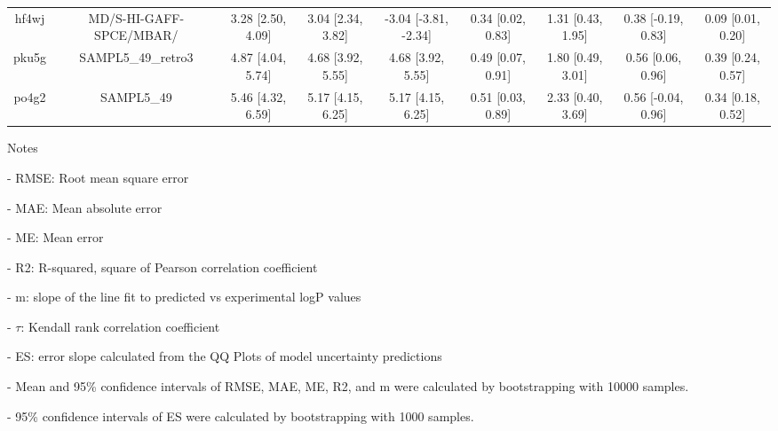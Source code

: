 \documentclass{article}
\begin{document}
\begin{center}
\begin{longtable}{|ccccccccc|}
 hf4wj &                            MD/S-HI-GAFF-SPCE/MBAR/ &  3.28 [2.50, 4.09] &  3.04 [2.34, 3.82] &  -3.04 [-3.81, -2.34] &  0.34 [0.02, 0.83] &    1.31 [0.43, 1.95] &   0.38 [-0.19, 0.83] &     0.09 [0.01, 0.20] \\
 pku5g &                                 SAMPL5\_49\_retro3 &  4.87 [4.04, 5.74] &  4.68 [3.92, 5.55] &     4.68 [3.92, 5.55] &  0.49 [0.07, 0.91] &    1.80 [0.49, 3.01] &    0.56 [0.06, 0.96] &     0.39 [0.24, 0.57] \\
 po4g2 &                                         SAMPL5\_49 &  5.46 [4.32, 6.59] &  5.17 [4.15, 6.25] &     5.17 [4.15, 6.25] &  0.51 [0.03, 0.89] &    2.33 [0.40, 3.69] &   0.56 [-0.04, 0.96] &     0.34 [0.18, 0.52] \\
\end{longtable}
\end{center}

Notes

- RMSE: Root mean square error

- MAE: Mean absolute error

- ME: Mean error

- R2: R-squared, square of Pearson correlation coefficient

- m: slope of the line fit to predicted vs experimental logP values

- $\tau$:  Kendall rank correlation coefficient

- ES: error slope calculated from the QQ Plots of model uncertainty predictions

- Mean and 95\% confidence intervals of RMSE, MAE, ME, R2, and m were calculated by bootstrapping with 10000 samples.

- 95\% confidence intervals of ES were calculated by bootstrapping with 1000 samples.\end{document}
\end{document}
